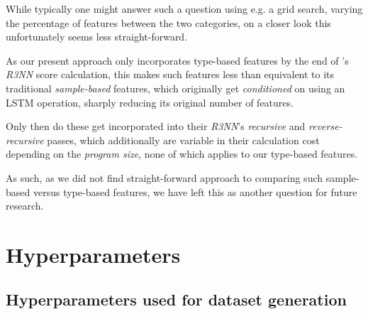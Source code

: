 \documentclass{article}
\begin{document}
    While typically one might answer such a question using e.g. a grid search,
    varying the percentage of features between the two categories,
    on a closer look this unfortunately seems less straight-forward.

    As our present approach only incorporates type-based features by the end of \citet{nsps}'s \emph{R3NN} score calculation,
    this makes such features less than equivalent to its traditional \emph{sample-based} features,
    which originally get \emph{conditioned} on using an LSTM operation,
    sharply reducing its original number of features.

    Only then do these get incorporated into their \emph{R3NN}'s \emph{recursive} and \emph{reverse-recursive} passes,
    which additionally are variable in their calculation cost depending on the \emph{program size},
    none of which applies to our type-based features.

    As such, as we did not find straight-forward approach to comparing such sample-based versus type-based features,
    we have left this as another question for future research.




\nocite{*}
% 


\pagebreak

\appendix

\section{Hyperparameters} \label{sec:hpar}

\subsection{Hyperparameters used for dataset generation}
\end{document}
